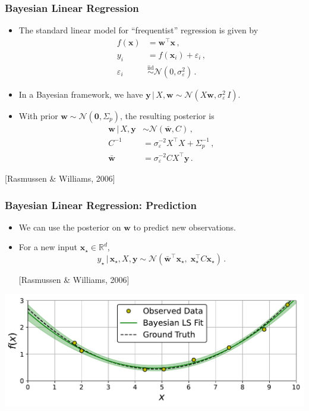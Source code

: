 \documentclass{beamer}
\newcommand{\R}{\mathbb{R}}
\newcommand{\vect}[1]{\boldsymbol{#1}}
\newcommand{\iid}{\ensuremath{\stackrel{\text{iid}}{\sim}}}
\newcommand{\nml}{\mathcal{N}}
\let\eps\varepsilon
\newcommand{\citeAY}[1]{
	\begin{flushright}
		{\footnotesize [#1]}
	\end{flushright}
}
\begin{document}
	\begin{frame}
		\frametitle{Bayesian Linear Regression}
		\begin{itemize}
			\item The standard linear model for ``frequentist'' regression is given by
			\begin{align*}
				f(\vect{x}) & =\vect{w}^\top\vect{x}\,,\\
				y_i & =f(\vect{x}_i)+\eps_i\,,\\
				\eps_i & \iid\nml(0,\sigma_\eps^2)\,.
			\end{align*}
			\item In a Bayesian framework, we have $\vect{y}\,|\,X,\vect{w}\sim\nml(X\vect{w},\sigma_\eps^2\,I)$.
			\item With prior $\vect{w}\sim\nml(\vect{0},\Sigma_p)$, the resulting posterior is
			\begin{align*}
				\vect{w}\,|\,X,\vect{y} & \sim\nml(\bar{\vect{w}},C)\,,\\
				C^{-1} & =\sigma_\eps^{-2}X^\top X+\Sigma_p^{-1}\,,\\
				\bar{\vect{w}} & =\sigma_\eps^{-2}CX^\top\vect{y}\,.
			\end{align*}
		\end{itemize}
		\citeAY{Rasmussen \& Williams, 2006}
	\end{frame}
	
	\begin{frame}
		\frametitle{Bayesian Linear Regression: Prediction}
		\begin{itemize}
			\item We can use the posterior on $\vect{w}$ to predict new observations.
			\item For a new input $\vect{x}_\star\in\R^d$,
			\begin{equation*}
				y_\star\,|\,\vect{x}_\star,X,\vect{y}\sim\nml(\bar{\vect{w}}^\top\vect{x}_\star,\;\vect{x}_\star^\top C\vect{x}_\star)\,.
			\end{equation*}
			\citeAY{Rasmussen \& Williams, 2006}
		\end{itemize}
		
		\begin{center}
			\includegraphics[scale=0.5]{figures/01c_bayesian_least_squares_wTrue.pdf} %
		\end{center}
	\end{frame}
	
\end{document}
